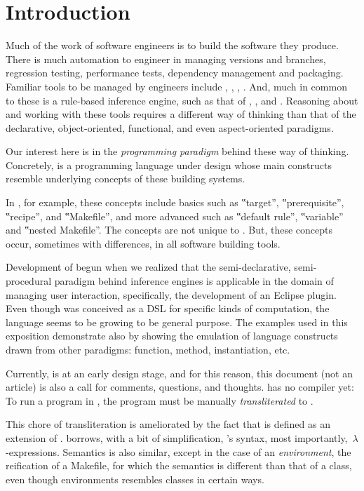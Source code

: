 \section{Introduction}

Much of the work of software engineers is to build the software they produce.
There is much automation to engineer in managing versions and branches,
regression testing, performance tests, dependency management and packaging.
Familiar tools to be managed by engineers include
,
,
, . And,
much in common to these is a rule-based inference engine, such as that of
, , and
. Reasoning about and working with these
tools requires a different way of thinking than that of the declarative,
object-oriented, functional, and even aspect-oriented paradigms.

Our interest here is in the \emph{programming paradigm} behind these way of
thinking. Concretely, \Reap is a programming language under design whose main
constructs resemble underlying concepts of these building systems.

In , for example, these concepts include basics such as ‟target”,
‟prerequisite”, ‟recipe”, and ‟Makefile”, and more advanced such as ‟default
rule”, ‟variable” and ‟nested Makefile”. The concepts are not unique to
. But, these concepts occur, sometimes with differences, in all
software building tools.

Development of \Reap begun when we realized that the semi-declarative,
semi-procedural paradigm behind inference engines is applicable in the domain
of managing user interaction, specifically, the development of an Eclipse
plugin. Even though \Reap was conceived as a DSL for specific kinds of
computation, the language seems to be growing to be general purpose. The
examples used in this exposition demonstrate \Reap also by showing the
emulation of language constructs drawn from other paradigms: function, method,
instantiation, etc.

Currently, \Reap is at an early design stage, and for this reason, this
document (not an article) is also a call for comments, questions, and thoughts.
\Reap has no compiler yet: To run a program in \Reap, the program must be
manually \emph{transliterated} to \Java.

This chore of transliteration is ameliorated by the fact that \Reap is defined
as an extension of \Java. \Reap borrows, with a bit of simplification, \Java's
syntax, most importantly,~$λ$-expressions. Semantics is also similar, except
in the case of an \emph{environment}, the \Reap reification of a
Makefile, for which the semantics is different than that of a \Java class, 
even though environments resembles classes in certain ways.

